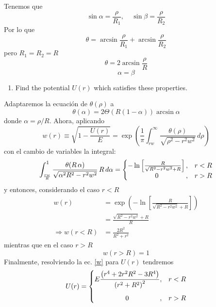 \documentclass[]{article}
\numberwithin{equation}{section}
\newcommand{\0}{\textcolor{gray}{0}}
\begin{document}
Tenemos que
\begin{equation}
	\sin\alpha = \frac{\rho}{R_{1}}, ~~~~~ \sin\beta = \frac{\rho}{R_{2}}
\end{equation}
Por lo que
\begin{equation*}
	\theta = \arcsin\frac{\rho}{R_{1}} + \arcsin\frac{\rho}{R_{2}}
\end{equation*}
pero \(R_{1} = R_{2} = R\)
\begin{equation}
	\theta = 2 \arcsin\frac{\rho}{R} \label{theta}
\end{equation}
\begin{equation}
	\alpha = \beta
\end{equation}


\begin{enumerate}
	\item[\textbf{b.}] Find the potential \(U(r)\) which satisfies these properties.
\end{enumerate}

Adaptaremos la ecuación de \(\theta(\rho)\) a
\begin{equation}
	\theta(\alpha) = 2 \Theta(R(1-\alpha))\arcsin\alpha
\end{equation}
donde \(\alpha = \rho / R\). Ahora, aplicando
\begin{equation}
	w(r) \equiv \sqrt{1 - \frac{U(r)}{E} } = \exp\left( \frac{1}{\pi } \int_{r w}^{\infty} \frac{\theta (\rho)}{\sqrt{\rho^2 - r^2 w^2} } \, d\rho \right) \label{w}
\end{equation}
con el cambio de variables la integral:
\begin{equation}
	\int_{\frac{r w}{R}}^1 \frac{\theta (R \,\alpha)}{\sqrt{\alpha ^2 R^2-r^2 w^2}} \, R \, d\alpha = \left\lbrace \begin{matrix}
		-\ln\left[\frac{R}{\sqrt{R^2-r^2 w^2}+R}\right], & r < R\\
		\hfill 0 \hfill, & r > R
	\end{matrix}\right.
\end{equation}
y entonces, considerando el caso \(r < R\)
\begin{align}
	w(r) &= \exp \left(-\ln\left[\frac{R}{\sqrt{R^2-r^2 w^2}+R}\right]\right)\nonumber\\
	&= \frac{\sqrt{R^2-r^2 w^2}+R}{R}\nonumber\\
	\Rightarrow w(r < R) &= \frac{2 R^2}{R^2 + r^2}
\end{align}
mientras que en el caso \(r > R\)
\begin{equation}
	w(r > R) = 1
\end{equation}
Finalmente, resolviendo la ec. \ref{w} para \(U(r)\) tendremos
\begin{equation}
	U(r) = \left\lbrace \begin{matrix}
		E \dfrac{\left(r^4+2 r^2 R^2-3 R^4\right)}{\left(r^2+R^2\right)^2}, & r < R \vspace{3mm}\\
		\hfill 0 \hfill, & r > R
	\end{matrix}\right.
\end{equation}
\end{document}
